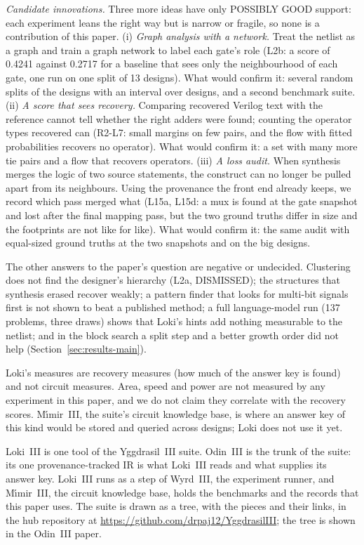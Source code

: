 \documentclass[conference]{IEEEtran}
\begin{document}
\emph{Candidate innovations.} Three more ideas have only POSSIBLY GOOD support: each experiment
leans the right way but is narrow or fragile, so none is a contribution of this paper.
(i) \emph{Graph analysis with a network.} Treat the netlist as a graph and train a graph network to label each
gate's role (L2b: a score of 0.4241 against 0.2717 for a baseline that sees only the neighbourhood
of each gate, one run on one split of 13 designs). What would confirm it: several random splits of the designs with an interval over designs, and
a second benchmark suite.
(ii) \emph{A score that sees recovery.} Comparing recovered Verilog text with the reference
cannot tell whether the right adders were found; counting the operator types recovered can
(R2-L7: small margins on few pairs, and the flow with fitted probabilities recovers no operator). What would confirm it:
a set with many more tie pairs and a flow that recovers operators.
(iii) \emph{A loss audit.} When synthesis merges the logic of two source statements, the
construct can no longer be pulled apart from its neighbours. Using the provenance the front end already
keeps, we record which pass merged what (L15a, L15d: a mux is found at the gate snapshot and lost after
the final mapping pass, but the two ground truths differ in size and the footprints are not like for like).
What would confirm it: the same audit with equal-sized ground truths at the two snapshots and on the big designs.

The other answers to the paper's question are negative or undecided. Clustering does not find
the designer's hierarchy (L2a, DISMISSED); the structures that synthesis erased recover weakly; a
pattern finder that looks for multi-bit signals first is not shown to beat a published method;
a full language-model run (137 problems, three draws) shows that Loki's hints add nothing measurable to the netlist; and in the block search a split step and a better growth order did not help (Section~\ref{sec:results-main}).

Loki's measures are recovery measures (how much of the answer key is found) and not circuit
measures. Area, speed and power are not measured by any experiment in this paper, and we do not
claim they correlate with the recovery scores. M\'{\i}mir~III, the suite's circuit knowledge base,
is where an answer key of this kind would be stored and queried across designs; Loki does not
use it yet.

Loki~III is one tool of the Yggdrasil~III suite. Odin~III is the trunk of the suite: its one provenance-tracked IR is what Loki~III reads and what supplies its answer key. Loki~III runs as a step of Wyrd~III, the experiment runner, and M\'{\i}mir~III, the circuit knowledge base, holds the benchmarks and the records that this paper uses. The suite is drawn as a tree, with the pieces and their links, in the hub repository at \url{https://github.com/drpaj12/YggdrasilIII}; the tree is shown in the Odin~III paper.
\end{document}
